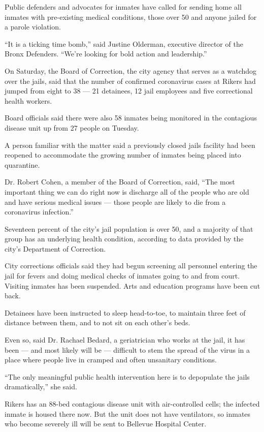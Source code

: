 Public defenders and advocates for inmates have called for sending home
all inmates with pre-existing medical conditions, those over 50 and
anyone jailed for a parole violation.

``It is a ticking time bomb,'' said Justine Olderman, executive director
of the Bronx Defenders. ``We're looking for bold action and
leadership.''

On Saturday, the Board of Correction, the city agency that serves as a
watchdog over the jails, said that the number of confirmed coronavirus
cases at Rikers had jumped from eight to 38 --- 21 detainees, 12 jail
employees and five correctional health workers.

Board officials said there were also 58 inmates being monitored in the
contagious disease unit up from 27 people on Tuesday.

A person familiar with the matter said a previously closed jails
facility had been reopened to accommodate the growing number of inmates
being placed into quarantine.

Dr. Robert Cohen, a member of the Board of Correction, said, ``The most
important thing we can do right now is discharge all of the people who
are old and have serious medical issues --- those people are likely to
die from a coronavirus infection.''

Seventeen percent of the city's jail population is over 50, and a
majority of that group has an underlying health condition, according to
data provided by the city's Department of Correction.

City corrections officials said they had begun screening all personnel
entering the jail for fevers and doing medical checks of inmates going
to and from court. Visiting inmates has been suspended. Arts and
education programs have been cut back.

Detainees have been instructed to sleep head-to-toe, to maintain three
feet of distance between them, and to not sit on each other's beds.

Even so, said Dr. Rachael Bedard, a geriatrician who works at the jail,
it has been --- and most likely will be --- difficult to stem the spread
of the virus in a place where people live in cramped and often
unsanitary conditions.

``The only meaningful public health intervention here is to depopulate
the jails dramatically,'' she said.

Rikers has an 88-bed contagious disease unit with air-controlled cells;
the infected inmate is housed there now. But the unit does not have
ventilators, so inmates who become severely ill will be sent to Bellevue
Hospital Center.

